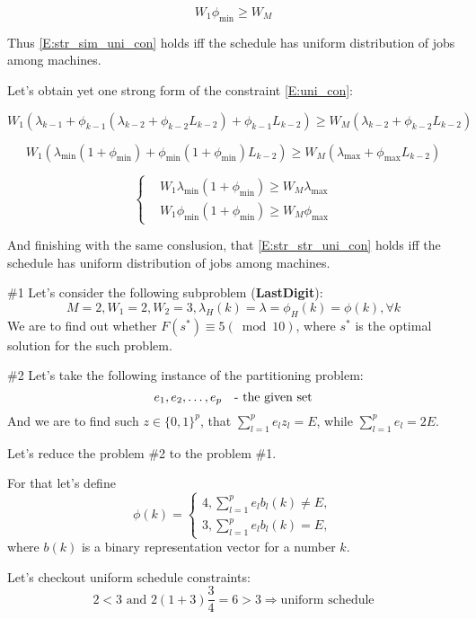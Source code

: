 \documentclass{amsart}
\begin{document}
\begin{equation}\label{E:str_sim_uni_con}
  W_1\phi_{\min} \geqslant W_M
\end{equation}

Thus \eqref{E:str_sim_uni_con} holds iff the schedule has uniform
distribution of jobs among machines.

Let's obtain yet one strong form of the constraint \eqref{E:uni_con}:

\[
  W_1(\lambda_{k-1} + \phi_{k-1}(\lambda_{k-2} + \phi_{k-2}L_{k-2})
    + \phi_{k-1}L_{k-2}) \geqslant
      W_M(\lambda_{k-2} + \phi_{k-2}L_{k-2})
\]

\[
  W_1(\lambda_{\min}(1+\phi_{\min}) + \phi_{\min}(1+\phi_{\min})L_{k-2})
    \geqslant W_M(\lambda_{\max} + \phi_{\max}L_{k-2})
\]

\begin{equation}\label{E:str_str_uni_con}
  \begin{cases}
    & W_1 \lambda_{\min}(1+\phi_{\min}) \geqslant W_M\lambda_{\max} \\
    & W_1 \phi_{\min}(1+\phi_{\min}) \geqslant W_M\phi_{\max}
  \end{cases}
\end{equation}

And finishing with the same conslusion, that \eqref{E:str_str_uni_con}
holds iff the schedule has uniform distribution of jobs among machines.

\#1 Let's consider the following subproblem ({\bf LastDigit}):
\[
  M=2, W_1=2, W_2=3, \lambda_H(k)=\lambda=\phi_H(k)=\phi(k), \forall k
\]
We are to find out whether $F(s^*) \equiv 5 (\bmod 10)$,
where $s^*$ is the optimal solution for the such problem.

\#2 Let's take the following instance of the partitioning problem:
\[
  e_1, e_2, \dots, e_p \text{\quad - the given set}
\]
And we are to find such $z \in { \{0,1\} }^p$, that
$\sum_{l=1}^p e_l z_l = E$, while $\sum_{l=1}^p e_l = 2E$.

Let's reduce the problem \#2 to the problem \#1.

For that let's define
\[
  \phi(k) =
  \begin{cases}
    4, \sum_{l=1}^p e_l b_l(k) \not = E, \\
    3, \sum_{l=1}^p e_l b_l(k) = E,
  \end{cases}
\]
where $b(k)$ is a binary representation vector for a number $k$.

Let's checkout uniform schedule constraints:
\[
  2 < 3 \text{ and } 2 (1 + 3) \frac{3}{4} = 6 > 3
  \Rightarrow \text{uniform schedule}
\]
\end{document}
